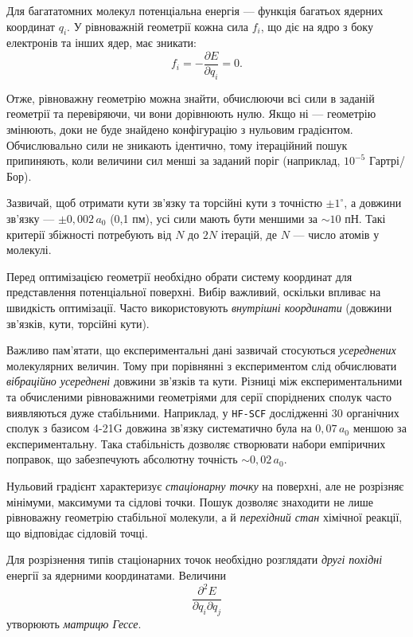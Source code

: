 \documentclass{PySCFBook}
\begin{document}
Для багататомних молекул потенціальна енергія --- функція багатьох ядерних координат $q_i$. У рівноважній геометрії кожна сила $f_i$, що діє на ядро з боку електронів та інших ядер, має зникати:
\begin{equation*}
f_i = -\frac{\partial E}{\partial q_i} = 0.
\end{equation*}

Отже, рівноважну геометрію можна знайти, обчислюючи всі сили в заданій геометрії та перевіряючи, чи вони дорівнюють нулю. Якщо ні --- геометрію змінюють, доки не буде знайдено конфігурацію з нульовим градієнтом. Обчислювально сили не зникають ідентично, тому ітераційний пошук припиняють, коли величини сил менші за заданий поріг (наприклад, $10^{-5}$ Гартрі/Бор).

Зазвичай, щоб отримати кути зв’язку та торсійні кути з точністю $\pm 1^\circ$, а довжини зв’язку --- $\pm 0{,}002\,a_0$ (0,1 пм), усі сили мають бути меншими за $\sim 10$ пН. Такі критерії збіжності потребують від $N$ до $2N$ ітерацій, де $N$ --- число атомів у молекулі.

Перед оптимізацією геометрії необхідно обрати систему координат для представлення потенціальної поверхні. Вибір важливий, оскільки впливає на швидкість оптимізації. Часто використовують \emph{внутрішні координати} (довжини зв’язків, кути, торсійні кути).

Важливо пам’ятати, що експериментальні дані зазвичай стосуються \emph{усереднених} молекулярних величин. Тому при порівнянні з експериментом слід обчислювати \emph{вібраційно усереднені} довжини зв’язків та кути. Різниці між експериментальними та обчисленими рівноважними геометріями для серії споріднених сполук часто виявляються дуже стабільними. Наприклад, у \texttt{HF-SCF} дослідженні 30 органічних сполук з базисом 4-21G довжина зв’язку  систематично була на $0{,}07\,a_0$ меншою за експериментальну. Така стабільність дозволяє створювати набори емпіричних поправок, що забезпечують абсолютну точність $\sim 0{,}02\,a_0$.

Нульовий градієнт характеризує \emph{стаціонарну точку} на поверхні, але не розрізняє мінімуми, максимуми та сідлові точки. Пошук дозволяє знаходити не лише рівноважну геометрію стабільної молекули, а й \emph{перехідний стан} хімічної реакції, що відповідає сідловій точці.

Для розрізнення типів стаціонарних точок необхідно розглядати \emph{другі похідні} енергії за ядерними координатами. Величини
\begin{equation*}
\frac{\partial^2 E}{\partial q_i \partial q_j}
\end{equation*}
утворюють \emph{матрицю Гессе}.
\end{document}
